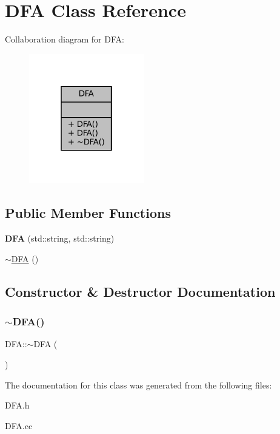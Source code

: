 \hypertarget{classDFA}{}\section{D\+FA Class Reference}
\label{classDFA}


Collaboration diagram for D\+FA\+:
\nopagebreak
\begin{figure}[H]
\begin{center}
\leavevmode
\includegraphics[width=142pt]{classDFA__coll__graph}
\end{center}
\end{figure}
\subsection*{Public Member Functions}
\begin{DoxyCompactItemize}
\item 
\mbox{\label{classDFA_a69571967ef142033f6794ef249bc6b3a}} 
{\bfseries D\+FA} (std\+::string, std\+::string)
\item 
\hyperlink{classDFA_a39dad6c188c8cbb86ecff25423a99936}{$\sim$\+D\+FA} ()
\end{DoxyCompactItemize}


\subsection{Constructor \& Destructor Documentation}
\mbox{\label{classDFA_a39dad6c188c8cbb86ecff25423a99936}} 
\subsubsection{\texorpdfstring{$\sim$\+D\+F\+A()}{~DFA()}}
{\footnotesize\ttfamily D\+F\+A\+::$\sim$\+D\+FA (\begin{DoxyParamCaption}{ }\end{DoxyParamCaption})}



The documentation for this class was generated from the following files\+:\begin{DoxyCompactItemize}
\item 
D\+F\+A.\+h\item 
D\+F\+A.\+cc\end{DoxyCompactItemize}
